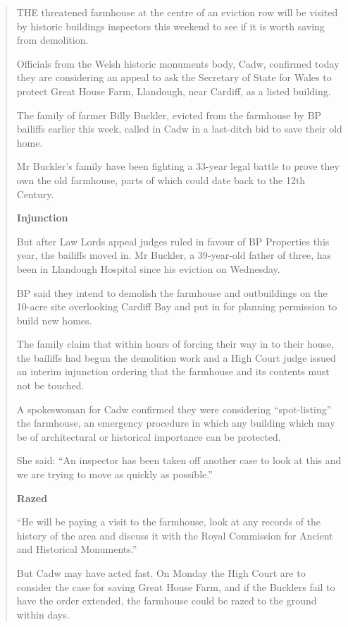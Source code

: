 \documentclass[11pt,a4paper]{article}
\begin{document}
\begin{quote}
THE threatened farmhouse at the centre of an eviction row will be visited by historic buildings inspectors this weekend to see if it is worth saving from demolition.

Officials from the Welsh historic monuments body, Cadw, confirmed today they are considering an appeal to ask the Secretary of State for Wales to protect Great House Farm, Llandough, near Cardiff, as a listed building.

The family of farmer Billy Buckler, evicted from the farmhouse by BP bailiffs earlier this week, called in Cadw in a last-ditch bid to save their old home.

Mr Buckler's family have been fighting a 33-year legal battle to prove they own the old farmhouse, parts of which could date back to the 12th Century.

\textbf{Injunction}

But after Law Lords appeal judges ruled in favour of BP Properties this year, the bailiffs moved in. Mr Buckler, a 39-year-old father of three, has been in Llandough Hospital since his eviction on Wednesday.

BP said they intend to demolish the farmhouse and outbuildings on the 10-acre site overlooking Cardiff Bay and put in for planning permission to build new homes.

The family claim that within hours of forcing their way in to their house, the bailiffs had begun the demolition work and a High Court judge issued an interim injunction ordering that the farmhouse and its contents must not be touched.

A spokeswoman for Cadw confirmed they were considering ``spot-listing'' the farmhouse, an emergency procedure in which any building which may be of architectural or historical importance can be protected.

She said: ``An inspector has been taken off another case to look at this and we are trying to move as quickly as possible.''

\textbf{Razed}

``He will be paying a visit to the farmhouse, look at any records of the history of the area and discuss it with the Royal Commission for Ancient and Historical Monuments.''

But Cadw may have acted fast. On Monday the High Court are to consider the case for saving Great House Farm, and if the Bucklers fail to have the order extended, the farmhouse could be razed to the ground within days.
\end{quote}
\end{document}
